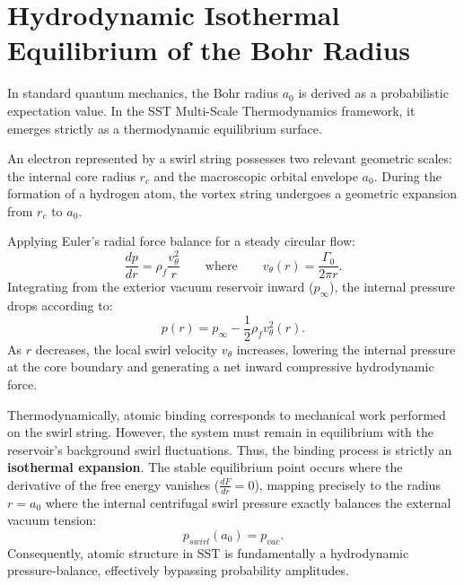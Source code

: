 \documentclass[11pt, a4paper]{article}
\newcommand{\rhof}{\rho_{\!f}}
\newcommand{\rc}{r_c}
\newcommand{\GammaSST}{\Gamma_0}
\begin{document}
        \section{Hydrodynamic Isothermal Equilibrium of the Bohr Radius}
        \label{sec:bohr_radius}
        
        In standard quantum mechanics, the Bohr radius $a_0$ is derived as a probabilistic expectation value. In the SST Multi-Scale Thermodynamics framework, it emerges strictly as a thermodynamic equilibrium surface.
        
        An electron represented by a swirl string possesses two relevant geometric scales: the internal core radius $\rc$ and the macroscopic orbital envelope $a_0$. During the formation of a hydrogen atom, the vortex string undergoes a geometric expansion from $\rc$ to $a_0$.
        
        Applying Euler's radial force balance for a steady circular flow:
        \begin{equation}
            \frac{dp}{dr} = \rhof \frac{v_\theta^2}{r} \qquad \text{where} \qquad v_\theta(r) = \frac{\GammaSST}{2\pi r}.
        \end{equation}
        Integrating from the exterior vacuum reservoir inward ($p_\infty$), the internal pressure drops according to:
        \begin{equation}
            p(r) = p_\infty - \frac{1}{2}\rhof v_\theta^2(r).
        \end{equation}
        As $r$ decreases, the local swirl velocity $v_\theta$ increases, lowering the internal pressure at the core boundary and generating a net inward compressive hydrodynamic force.
        
        Thermodynamically, atomic binding corresponds to mechanical work performed on the swirl string. However, the system must remain in equilibrium with the reservoir's background swirl fluctuations. Thus, the binding process is strictly an \textbf{isothermal expansion}. The stable equilibrium point occurs where the derivative of the free energy vanishes ($\frac{dF}{dr} = 0$), mapping precisely to the radius $r = a_0$ where the internal centrifugal swirl pressure exactly balances the external vacuum tension:
        \begin{equation}
            p_{swirl}(a_0) = p_{vac}.
        \end{equation}
        Consequently, atomic structure in SST is fundamentally a hydrodynamic pressure-balance, effectively bypassing probability amplitudes.
        
\end{document}
